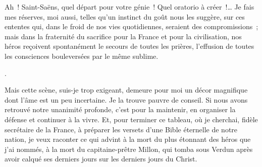 \documentclass[french,twoside]{book} %
\begin{document}
{ \par
\noindent Ah ! Saint-Saëns, quel départ pour votre génie ! Quel oratorio à créer !… Je fais mes réserves, moi aussi, telles qu’un instinct du goût nous les suggère, sur ces ententes qui, dans le froid de nos vies quotidiennes, seraient des compromissions ; mais dans la fraternité du sacrifice pour la France et pour la civilisation, nos héros reçoivent spontanément le secours de toutes les prières, l’effusion de toutes les consciences bouleversées par le même sublime.
 }.‌\par
Mais cette scène, suis-je trop exigeant, demeure pour moi un décor magnifique dont l’âme est un peu incertaine. Je la trouve pauvre de conseil. Si nous avons retrouvé notre unanimité profonde, c’est pour la maintenir, en organiser la défense et continuer à la vivre. Et, pour terminer ce tableau, où je cherchai, fidèle secrétaire de la France, à préparer les versets d’une Bible éternelle de notre nation, je veux raconter ce qui advint à la mort du plus étonnant des héros que j’ai nommés, à la mort du capitaine-prêtre Millon, qui tomba sous Verdun après avoir calqué ses derniers jours sur les derniers jours du Christ.‌\par
\end{document}
